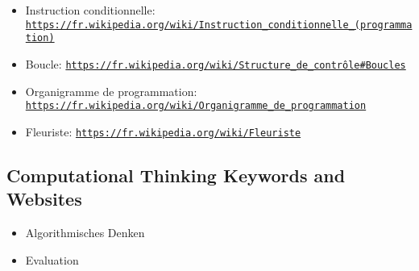 \documentclass[a4paper,11pt]{report}
\newcommand{\BrochureUrlText}[1]{\texttt{#1}}
\begin{document}
\begin{itemize}
  \item Instruction conditionnelle: \href{https://fr.wikipedia.org/wiki/Instruction_conditionnelle_(programmation)}{\BrochureUrlText{https://fr.wikipedia.org/wiki/Instruction\_conditionnelle\_(programmation)}}
  \item Boucle: \href{https://fr.wikipedia.org/wiki/Structure_de_contr\%C3\%B4le\#Boucles}{\BrochureUrlText{https://fr.wikipedia.org/wiki/Structure\_de\_contrôle\#Boucles}}
  \item Organigramme de programmation: \href{https://fr.wikipedia.org/wiki/Organigramme_de_programmation}{\BrochureUrlText{https://fr.wikipedia.org/wiki/Organigramme\_de\_programmation}}
  \item Fleuriste: \href{https://fr.wikipedia.org/wiki/Fleuriste}{\BrochureUrlText{https://fr.wikipedia.org/wiki/Fleuriste}}
\end{itemize}


\subsection*{Computational Thinking Keywords and Websites}

\begin{itemize}
  \item Algorithmisches Denken
  \item Evaluation
\end{itemize}
\end{document}
